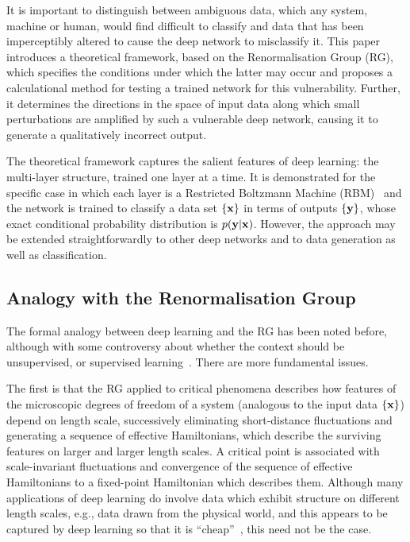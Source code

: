 \documentclass[reprint,amsmath,amssymb,aps]{revtex4-1}
\begin{document}
It is important to distinguish between ambiguous data, which any system, machine or human, would find difficult to classify and data that has been imperceptibly altered to cause the deep network to misclassify it. This paper introduces a theoretical framework, based on the Renormalisation Group (RG), which specifies the conditions under which the latter may occur and proposes a calculational method for testing a trained network for this vulnerability. Further, it determines the directions in the space of input data along which small perturbations are amplified by such a vulnerable deep network, causing it to generate a qualitatively incorrect output.

The theoretical framework captures the salient features of deep learning: the multi-layer structure, trained one layer at a time. It is demonstrated for the specific case in which each layer is a Restricted Boltzmann Machine (RBM)~\cite{Salakhutdinov2015} and the network is trained to classify a data set $\{\bf x\}$ in terms of outputs $\{\bf y\}$, whose exact conditional probability distribution is $p(\bf y|\bf x)$. However, the approach may be extended straightforwardly to other deep networks and to data generation as well as classification.

\subsection{\label{subsec:RG} Analogy with the Renormalisation Group}

The formal analogy between deep learning and the RG has been noted before, although with some controversy about whether the context should be unsupervised, or supervised learning~\cite{MehtaSchwab2014, LinTegmarkRolnick2017, SchwabMehta2016}. There are more fundamental issues.

The first is that the RG applied to critical phenomena describes how features of the microscopic degrees of freedom of a system (analogous to the input data $\{\bf x\}$) depend on length scale, successively eliminating short-distance fluctuations and generating a sequence of effective Hamiltonians, which describe the surviving features on larger and larger length scales. A critical point is associated with scale-invariant fluctuations and convergence of the sequence of effective Hamiltonians to a fixed-point Hamiltonian which describes them. Although many applications of deep learning do involve data which exhibit structure on different length scales, e.g., data drawn from the physical world, and this appears to be captured by deep learning so that it is ``cheap''~\cite{LinTegmarkRolnick2017}, this need not be the case.
\end{document}
